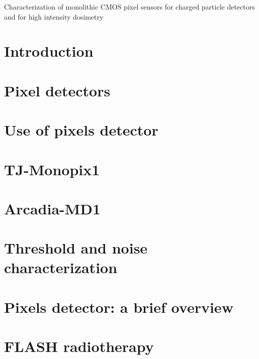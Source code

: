 \documentclass[a4paper]{report}
\begin{document}
\linenumbers

\tableofcontents

Characterization of monolithic CMOS pixel sensors for charged particle detectors and for high intensity dosimetry 

\chapter{Introduction}


\chapter{Pixel detectors}


\chapter{Use of pixels detector}


\chapter{TJ-Monopix1}


\chapter{Arcadia-MD1}


\chapter{Threshold and noise characterization}


\appendix
\chapter{Pixels detector: a brief overview}


\chapter{FLASH radiotherapy}



\printbibliography[heading=bibintoc, title={Bibliography}] 
\end{document}
